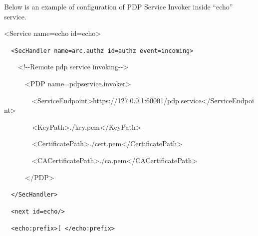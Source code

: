 \documentclass{article}
\begin{document}
{\upshape\color{black}
Below is an example of configuration of PDP Service Invoker inside
{\textquotedblleft}echo{\textquotedblright} service.}

{\ttfamily\color{black}
{\textless}Service name={\textquotedbl}echo{\textquotedbl}
id={\textquotedbl}echo{\textquotedbl}{\textgreater}}

{\upshape\color{black}
\foreignlanguage{spanish}{\texttt{\ \ }}\texttt{{\textless}SecHandler
name={\textquotedbl}arc.authz{\textquotedbl}
id={\textquotedbl}authz{\textquotedbl}
event={\textquotedbl}incoming{\textquotedbl}{\textgreater}}}

{\ttfamily\color{black}
\ \ \ \ {\textless}!-{}-Remote pdp service invoking-{}-{\textgreater}}

{\ttfamily\color{black}
\ \ \ \ \ \ {\textless}PDP
name={\textquotedbl}pdpservice.invoker{\textquotedbl}{\textgreater}}

{\ttfamily\color{black}
\ \ \ \ \ \ \ \ {\textless}ServiceEndpoint{\textgreater}https://127.0.0.1:60001/pdp.service{\textless}/ServiceEndpoint{\textgreater}}

{\ttfamily\color{black}
\ \ \ \ \ \ \ \ {\textless}KeyPath{\textgreater}./key.pem{\textless}/KeyPath{\textgreater}}

{\ttfamily\color{black}
\ \ \ \ \ \ \ \ {\textless}CertificatePath{\textgreater}./cert.pem{\textless}/CertificatePath{\textgreater}}

{\ttfamily\color{black}
\ \ \ \ \ \ \ \ {\textless}CACertificatePath{\textgreater}./ca.pem{\textless}/CACertificatePath{\textgreater}}

{\ttfamily\color{black}
\ \ \ \ \ \ {\textless}/PDP{\textgreater}}

{\upshape\color{black}
\texttt{\ \ }\foreignlanguage{spanish}{\texttt{{\textless}/SecHandler{\textgreater}}}}

{\upshape\color{black}
\foreignlanguage{spanish}{\texttt{\ \ }}\foreignlanguage{spanish}{\texttt{{\textless}next
id={\textquotedbl}echo{\textquotedbl}/{\textgreater}}}}

{\upshape\color{black}
\foreignlanguage{spanish}{\texttt{\ \ }}\foreignlanguage{spanish}{\texttt{{\textless}echo:prefix{\textgreater}[
{\textless}/echo:prefix{\textgreater}}}}
\end{document}
